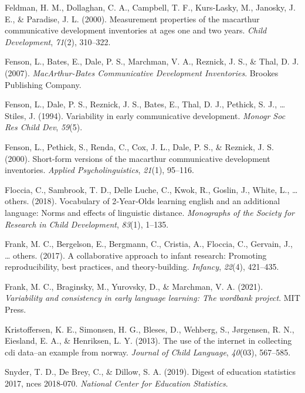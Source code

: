 \documentclass[
  english,
  ,man,floatsintext]{apa6}
\begin{document}
\leavevmode\hypertarget{ref-feldman2000}{}%
Feldman, H. M., Dollaghan, C. A., Campbell, T. F., Kurs-Lasky, M., Janosky, J. E., \& Paradise, J. L. (2000). Measurement properties of the macarthur communicative development inventories at ages one and two years. \emph{Child Development}, \emph{71}(2), 310--322.

\leavevmode\hypertarget{ref-fenson2007}{}%
Fenson, L., Bates, E., Dale, P. S., Marchman, V. A., Reznick, J. S., \& Thal, D. J. (2007). \emph{MacArthur-Bates Communicative Development Inventories}. Brookes Publishing Company.

\leavevmode\hypertarget{ref-fenson1994}{}%
Fenson, L., Dale, P. S., Reznick, J. S., Bates, E., Thal, D. J., Pethick, S. J., \ldots{} Stiles, J. (1994). Variability in early communicative development. \emph{Monogr Soc Res Child Dev}, \emph{59}(5).

\leavevmode\hypertarget{ref-fenson2000b}{}%
Fenson, L., Pethick, S., Renda, C., Cox, J. L., Dale, P. S., \& Reznick, J. S. (2000). Short-form versions of the macarthur communicative development inventories. \emph{Applied Psycholinguistics}, \emph{21}(1), 95--116.

\leavevmode\hypertarget{ref-floccia2018}{}%
Floccia, C., Sambrook, T. D., Delle Luche, C., Kwok, R., Goslin, J., White, L., \ldots{} others. (2018). Vocabulary of 2‐Year‐Olds learning english and an additional language: Norms and effects of linguistic distance. \emph{Monographs of the Society for Research in Child Development}, \emph{83}(1), 1--135.

\leavevmode\hypertarget{ref-frank2017}{}%
Frank, M. C., Bergelson, E., Bergmann, C., Cristia, A., Floccia, C., Gervain, J., \ldots{} others. (2017). A collaborative approach to infant research: Promoting reproducibility, best practices, and theory-building. \emph{Infancy}, \emph{22}(4), 421--435.

\leavevmode\hypertarget{ref-Frank2021}{}%
Frank, M. C., Braginsky, M., Yurovsky, D., \& Marchman, V. A. (2021). \emph{Variability and consistency in early language learning: The wordbank project}. MIT Press.

\leavevmode\hypertarget{ref-kristoffersen2013}{}%
Kristoffersen, K. E., Simonsen, H. G., Bleses, D., Wehberg, S., Jørgensen, R. N., Eiesland, E. A., \& Henriksen, L. Y. (2013). The use of the internet in collecting cdi data--an example from norway. \emph{Journal of Child Language}, \emph{40}(03), 567--585.

\leavevmode\hypertarget{ref-Snyder2019}{}%
Snyder, T. D., De Brey, C., \& Dillow, S. A. (2019). Digest of education statistics 2017, nces 2018-070. \emph{National Center for Education Statistics}.
\end{document}
